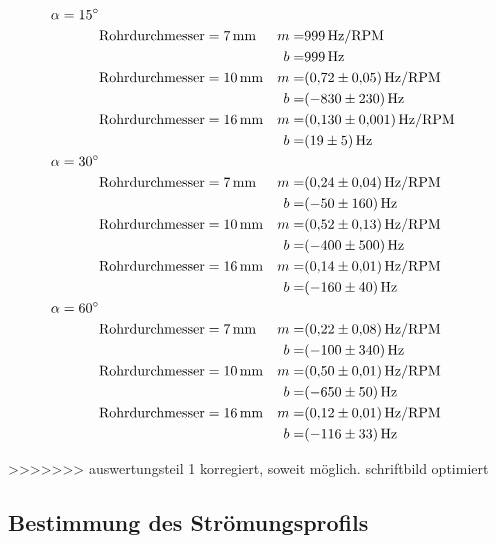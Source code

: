 \begin{align*}
	\alpha = \SI{15}{\degree} 	& \\
								& \text{Rohrdurchmesser}=\SI{7}{\milli\meter} 	& m=&\SI{999}{\hertz\per RPM}\\
								&												& b=&\SI{999}{\hertz}\\
								& \text{Rohrdurchmesser}=\SI{10}{\milli\meter} 	& m=&\SI{0.72\pm0.05}{\hertz\per RPM}\\
								&												& b=&\SI{-830\pm230}{\hertz}\\
								& \text{Rohrdurchmesser}=\SI{16}{\milli\meter} 	& m=&\SI{0.130\pm0.001}{\hertz\per RPM}\\
								&												& b=&\SI{19\pm5}{\hertz}\\
	\alpha = \SI{30}{\degree} 	& \\
								& \text{Rohrdurchmesser}=\SI{7}{\milli\meter} 	& m=&\SI{0.24\pm0.04}{\hertz\per RPM}\\
								&												& b=&\SI{-50\pm160}{\hertz}\\
								& \text{Rohrdurchmesser}=\SI{10}{\milli\meter} 	& m=&\SI{0.52\pm0.13}{\hertz\per RPM}\\
								&												& b=&\SI{-400\pm500}{\hertz}\\
								& \text{Rohrdurchmesser}=\SI{16}{\milli\meter} 	& m=&\SI{0.14\pm0.01}{\hertz\per RPM}\\
								&												& b=&\SI{-160\pm40}{\hertz}\\
	\alpha = \SI{60}{\degree} 	& \\
								& \text{Rohrdurchmesser}=\SI{7}{\milli\meter} 	& m=&\SI{0.22\pm0.08}{\hertz\per RPM}\\
								&												& b=&\SI{-100\pm340}{\hertz}\\
								& \text{Rohrdurchmesser}=\SI{10}{\milli\meter} 	& m=&\SI{0.50\pm0.01}{\hertz\per RPM}\\
								&												& b=&\SI{-650\pm50}{\hertz}\\
								& \text{Rohrdurchmesser}=\SI{16}{\milli\meter} 	& m=&\SI{0.12\pm0.01}{\hertz\per RPM}\\
								&												& b=&\SI{-116\pm33}{\hertz}\\
\end{align*}


>>>>>>> auswertungsteil 1 korregiert, soweit möglich. schriftbild optimiert

\subsection{Bestimmung des Strömungsprofils}
